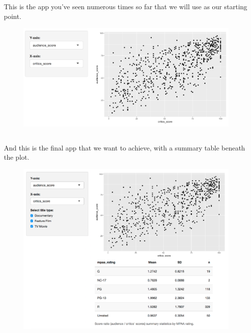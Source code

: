 \documentclass[
  letterpaper,
  DIV=11,
  numbers=noendperiod]{scrreprt}
\begin{document}
\hypertarget{section-22}{%
\subsection{}\label{section-22}}

This is the app you've seen numerous times so far that we will use as
our starting point.

\begin{figure}

{\centering \includegraphics[width=1\textwidth,height=\textheight]{./images/app-selectinput-scatterplot.png}

}

\end{figure}

\hypertarget{section-23}{%
\subsection{}\label{section-23}}

And this is the final app that we want to achieve, with a summary table
beneath the plot.

\begin{figure}

{\centering \includegraphics[width=1\textwidth,height=\textheight]{./images/app-summary-table.png}

}

\end{figure}
\end{document}
